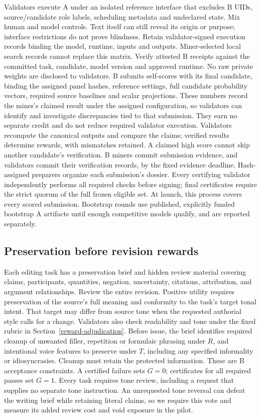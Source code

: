 Validators execute A under an isolated reference interface that excludes B UIDs,
source/candidate role labels, scheduling metadata and undeclared state.
Mix human and model controls. Text itself can still reveal its origin
or purpose; interface restrictions do not prove blindness. Retain
validator-signed execution records binding the model, runtime, inputs
and outputs. Miner-selected local search records cannot replace this
matrix. Verify attested B receipts against the committed task, candidate,
model version and approved runtime. No raw private weights are disclosed
to validators. B submits self-scores with its final candidate, binding the
assigned panel hashes, reference settings, full candidate probability
vectors, required source baselines and scalar projections. These numbers
record the miner's claimed result under the assigned configuration, so
validators can identify and investigate discrepancies tied to that
submission. They earn no separate credit and do not reduce required
validator execution. Validators
recompute the canonical outputs and compare the claims; verified results
determine rewards, with mismatches retained. A claimed high score cannot
skip another candidate's verification. B miners commit submission evidence,
and validators commit their verification records, by the fixed evidence
deadline. Hash-assigned preparers organize each submission's dossier.
Every certifying validator independently performs
all required checks before signing; final certificates require the strict
quorum of the full frozen eligible set. At launch, this process covers
every scored submission. Bootstrap rounds
use published, explicitly funded bootstrap A artifacts until enough
competitive models qualify, and are reported separately.

\subsection{Preservation before revision
rewards}\label{preservation-before-revision-rewards}

Each editing task has a preservation brief and hidden review material
covering claims, participants, quantities, negation, uncertainty,
citations, attribution, and argument relationships. Review the entire
revision. Positive utility requires preservation of the source's full
meaning and conformity to the task's target tonal intent. That target
may differ from source tone when the requested authorial style calls
for a change. Validators also check readability and tone under
the fixed rubric in Section~\ref{reward-adjudication}. Before issue, the
brief identifies required cleanup of unwanted filler, repetition or
formulaic phrasing under \(R\), and intentional voice features to
preserve under \(T\), including any specified informality or
idiosyncrasies. Cleanup must retain the protected information. These are B
acceptance constraints. A certified failure sets \(G=0\); certificates
for all required passes set \(G=1\). Every task requires tone review,
including a request that supplies no separate tone instruction.
An unrequested tone reversal can defeat the writing brief while retaining
literal claims, so we require this vote and measure its added review
cost and void exposure in the pilot.

